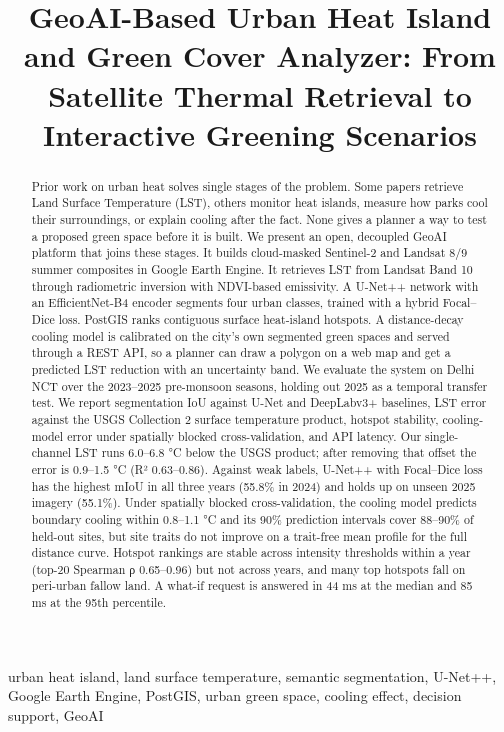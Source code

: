 \documentclass[conference]{IEEEtran}
\begin{document}
\title{GeoAI-Based Urban Heat Island and Green Cover Analyzer: From Satellite
Thermal Retrieval to Interactive Greening Scenarios}
\author{
}
\maketitle
\begin{abstract}
Prior work on urban heat solves single stages of the problem. Some
papers retrieve Land Surface Temperature (LST), others monitor heat
islands, measure how parks cool their surroundings, or explain cooling
after the fact. None gives a planner a way to test a proposed green
space before it is built. We present an open, decoupled GeoAI platform
that joins these stages. It builds cloud-masked Sentinel-2 and Landsat
8/9 summer composites in Google Earth Engine. It retrieves LST from
Landsat Band 10 through radiometric inversion with NDVI-based
emissivity. A U-Net++ network with an EfficientNet-B4 encoder segments
four urban classes, trained with a hybrid Focal--Dice loss. PostGIS
ranks contiguous surface heat-island hotspots. A distance-decay cooling
model is calibrated on the city's own segmented green spaces and served
through a REST API, so a planner can draw a polygon on a web map and get
a predicted LST reduction with an uncertainty band. We evaluate the
system on Delhi NCT over the 2023--2025 pre-monsoon seasons, holding out
2025 as a temporal transfer test. We report segmentation IoU against
U-Net and DeepLabv3+ baselines, LST error against the USGS Collection 2
surface temperature product, hotspot stability, cooling-model error
under spatially blocked cross-validation, and API latency. Our
single-channel LST runs 6.0--6.8 °C below the USGS product; after
removing that offset the error is 0.9--1.5 °C (R² 0.63--0.86). Against
weak labels, U-Net++ with Focal--Dice loss has the highest mIoU in all
three years (55.8\% in 2024) and holds up on unseen 2025 imagery
(55.1\%). Under spatially blocked cross-validation, the cooling model
predicts boundary cooling within 0.8--1.1 °C and its 90\% prediction
intervals cover 88--90\% of held-out sites, but site traits do not
improve on a trait-free mean profile for the full distance curve.
Hotspot rankings are stable across intensity thresholds within a year
(top-20 Spearman ρ 0.65--0.96) but not across years, and many top
hotspots fall on peri-urban fallow land. A what-if request is answered
in 44 ms at the median and 85 ms at the 95th percentile.
\end{abstract}
\begin{IEEEkeywords}
urban heat island, land surface temperature, semantic segmentation, U-Net++, Google Earth Engine, PostGIS, urban green space, cooling effect, decision support, GeoAI
\end{IEEEkeywords}
\end{document}
